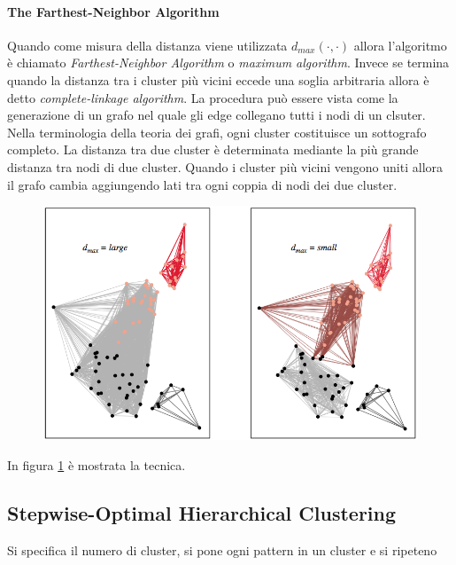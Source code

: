 \paragraph{The Farthest-Neighbor Algorithm}
Quando come misura della distanza viene utilizzata $d_{max}(\cdot, \cdot)$ allora l'algoritmo è chiamato \emph{Farthest-Neighbor Algorithm} o \emph{maximum algorithm}. Invece se termina quando la distanza tra i cluster più vicini eccede una soglia arbitraria allora è detto \emph{complete-linkage algorithm}. La procedura può essere vista come la generazione di un grafo nel quale gli edge collegano tutti i nodi di un clsuter. Nella terminologia della teoria dei grafi, ogni cluster costituisce un sottografo completo. La distanza tra due cluster è determinata mediante la più grande distanza tra nodi di due cluster. Quando i cluster più vicini vengono uniti allora il grafo cambia aggiungendo lati tra ogni coppia di nodi dei due cluster. 
\begin{figure}
\centering
\includegraphics[scale=0.4]{img/grafo2.png}
\caption{}
\label{grafo2}
\end{figure}
In figura \ref{grafo2} è mostrata la tecnica. 

\subsection{Stepwise-Optimal Hierarchical Clustering}
Si specifica il numero di cluster, si pone ogni pattern in un cluster e si ripeteno


%
